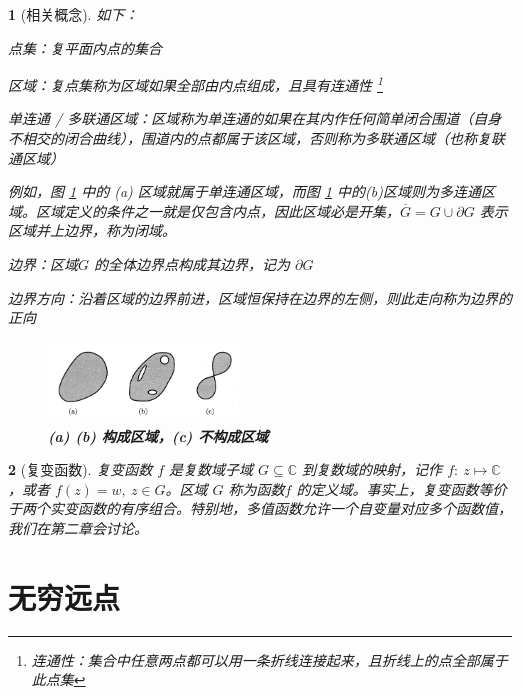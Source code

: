 \documentclass[UTF8]{report}
\def\C{\mathbb{C}}
\def\p{\partial}
\theoremstyle{MyLineTheoremStyle} %
\theoremstyle{MyBlockTheoremStyle} %
\theoremstyle{MySubsubsectionStyle} %
\newtheorem{definition}{}
\begin{document}
\begin{definition}[相关概念]
如下：
\begin{circledenum}
\item 点集：复平面内点的集合
\item 区域：复点集称为区域如果全部由内点组成，且具有连通性 
\footnote{连通性：集合中任意两点都可以用一条折线连接起来，且折线上的点全部属于此点集}
\item 单连通 / 多联通区域：区域称为单连通的如果在其内作任何简单闭合围道（自身不相交的闭合曲线），围道内的点都属于该区域，否则称为多联通区域（也称复联通区域）
{\par\color{gray}\small
例如，图 \ref{(a) (b) 构成区域，(c) 不构成区域} 中的 (a) 区域就属于单连通区域，而图 \ref{(a) (b) 构成区域，(c) 不构成区域} 中的(b)区域则为多连通区域。区域定义的条件之一就是仅包含内点，因此区域必是开集，$\overline{G} = G \cup \partial G$ 表示区域并上边界，称为闭域。
\par}
\item 边界：区域$G$ 的全体边界点构成其边界，记为 $\p G$
\item 边界方向：沿着区域的边界前进，区域恒保持在边界的左侧，则此走向称为边界的正向 
\end{circledenum}

\begin{figure}[H]\centering
\includegraphics[width=0.45\textwidth]{assets/1,2/4d651e08624250e2b6a287f557fe1cf8.png}
\caption{\textbf{(a) (b) 构成区域，(c) 不构成区域}}\label{(a) (b) 构成区域，(c) 不构成区域}
\end{figure}
\end{definition}


\begin{definition}[复变函数]
复变函数 $f$ 是复数域子域 $G \subseteq \C$ 到复数域的映射，记作 $f:\ z \longmapsto \C$，或者 $f(z) = w,\ z \in G$。区域 $G$ 称为函数$f$  的定义域。事实上，复变函数等价于两个实变函数的有序组合。特别地，多值函数允许一个自变量对应多个函数值，我们在第二章会讨论。

\end{definition}

\section{无穷远点}
\end{document}
